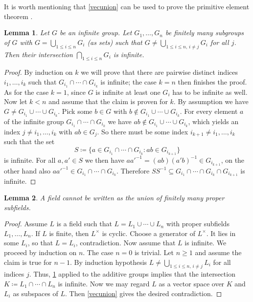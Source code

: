 \documentclass[11pt,reqno]{amsart}
\theoremstyle{standard}
\newtheorem{lemma}{Lemma}[section]
\theoremstyle{definition}
\begin{document}
It is worth mentioning that \cref{vecunion} can be used to prove the primitive element theorem \cite[Thm.\ 5.4.11]{Douady}.

\begin{lemma} \label{groupintersect}
Let $G$ be an infinite group. Let $G_1,\dotsc,G_n$ be finitely many subgroups of $G$ with $G = \bigcup_{1 \leq i \leq n} G_i$ (as sets) such that $G \neq \bigcup_{1 \leq i \leq n,\, i \neq j} G_i$ for all $j$. Then their intersection $\bigcap_{1 \leq i \leq n} G_i$ is infinite.
\end{lemma}

\begin{proof}
By induction on $k$ we will prove that there are pairwise distinct indices $i_1,\dotsc,i_k$ such that $G_{i_1} \cap \cdots \cap G_{i_k}$ is infinite; the case $k=n$ then finishes the proof. As for the case  $k=1$, since $G$ is infinite at least one $G_i$ has to be infinite as well. Now let $ k < n$ and assume that the claim is proven for $k$. By assumption we have $G \neq G_{i_1} \cup \cdots \cup G_{i_k}$. Pick some $b \in G$ with $b \notin G_{i_1} \cup \cdots \cup G_{i_k}$. For every element $a$ of the infinite group $G_{i_1}  \cap \cdots \cap G_{i_k}$ we have $ab \notin  G_{i_1} \cup \cdots \cup G_{i_k}$, which yields an index $j \neq i_1,\dotsc,i_k$ with $ab \in G_j$. So there must be some index $i_{k+1} \neq i_1,\dotsc,i_k$ such that the set
\[S \coloneqq \bigl\{a \in G_{i_1}  \cap \cdots \cap G_{i_k} : ab \in G_{i_{k+1}}\bigr\}\]
is infinite. For all $a,a' \in S$ we then have $aa'^{-1} = (ab)(a'b)^{-1} \in G_{i_{k+1}}$, on the other hand also $aa'^{-1} \in G_{i_1} \cap \cdots \cap G_{i_k}$. Therefore $SS^{-1} \subseteq G_{i_1} \cap \cdots \cap G_{i_k} \cap G_{i_{k+1}}$ is infinite.
\end{proof}

\begin{lemma} \label{fieldunion}
A field cannot be written as the union of finitely many proper subfields.
\end{lemma}

\begin{proof}
Assume $L$ is a field such that $L = L_1 \cup \cdots \cup L_n$ with proper subfields $L_1,\dotsc,L_n$. If $L$ is finite, then $L^{\times}$ is cyclic. Choose a generator of $L^{\times}$. It lies in some $L_i$, so that $L = L_i$, contradiction. Now assume that $L$ is infinite. We proceed by induction on $n$. The case $n=0$ is trivial. Let $n \geq 1$ and assume the claim is true for $n-1$. By induction hypothesis $L \neq \bigcup_{1 \leq i \leq n,\, i \neq j} L_i$ for all indices $j$. Thus, \cref{groupintersect} applied to the additive groups implies that the intersection $K \coloneqq L_1 \cap \cdots \cap L_n$ is infinite. Now we may regard $L$ as a vector space over $K$ and $L_i$ as subspaces of $L$. Then \cref{vecunion} gives the desired contradiction.
\end{proof}
\end{document}
